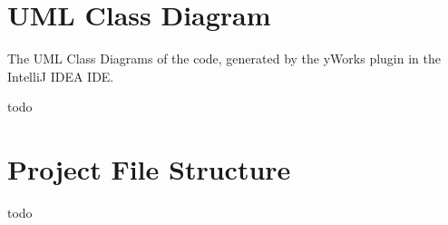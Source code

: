 \documentclass[letterpaper,12pt]{article}
\begin{document}
\begin{appendices}

\clearpage




\clearpage
\section{UML Class Diagram}
\label{sec:appendix-uml-class-diagram}

The UML Class Diagrams of the code, generated by the yWorks \cite{yworks} plugin in the IntelliJ IDEA IDE.

todo


\clearpage
\section{Project File Structure}
\label{sec:appendix-project-file-structure}

todo


\end{appendices}
\end{document}
